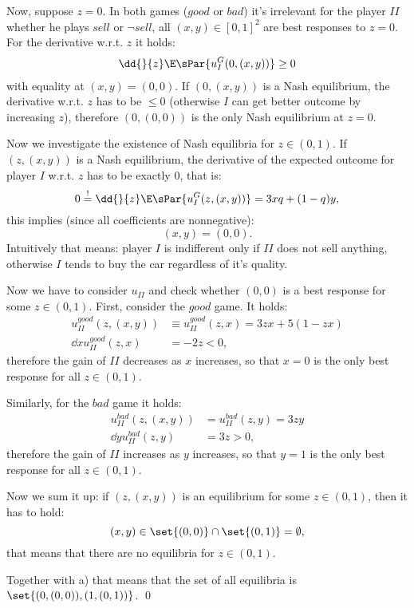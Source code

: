 \documentclass{scrartcl}
\newcommand{\subexercise}[1]{\vspace{0.8em}\noindent{\bf #1)}}
\begin{document}
Now, suppose $z=0$.
In both games ($good$ or $bad$) it's irrelevant for the player $II$
whether he plays $sell$ or $\neg sell$, all $(x,y) \in [0,1]^2$
are best responses to $z=0$. For the derivative w.r.t. $z$ it holds:
\begin{align*}
  \dd{}{z}\E\sPar{u_I^G(0, (x, y))} \geq 0
\end{align*}
with equality at $(x, y) = (0,0)$. If $(0, (x,y))$ is a Nash equilibrium,
the derivative w.r.t. $z$ has to be $\leq 0$ 
(otherwise $I$ can get better outcome by increasing $z$), 
therefore $(0, (0, 0))$ is the only Nash equilibrium
at $z=0$.

\subexercise{b}
Now we investigate the existence of Nash equilibria for $z\in(0, 1)$.
If $(z, (x, y))$ is a Nash equilibrium, the derivative of the
expected outcome for player $I$ w.r.t. $z$ has to be exactly $0$, that
is:
\[
  0 \overset{!}= \dd{}{z}\E\sPar{u_I^G(z, (x, y))} = 3xq + (1-q)y,
\]
this implies (since all coefficients are nonnegative):
\[
  (x, y) = (0, 0).
\]
Intuitively that means: player $I$ is indifferent only if $II$ does not
sell anything, otherwise $I$ tends to buy the car regardless of it's 
quality.

Now we have to consider $u_{II}$ and check whether $(0, 0)$ is a best
response for some $z\in(0, 1)$. First, consider the $good$ game.
It holds:
\begin{align*}
  u_{II}^{good}(z, (x, y)) &\equiv u_{II}^{good}(z, x) = 3zx + 5 (1-zx) \\
  \dd{}{x} u_{II}^{good}(z, x) &= -2z < 0,
\end{align*}
therefore the gain of $II$ decreases as $x$ increases, so that $x=0$ is the
only best response for all $z\in (0, 1)$.

Similarly, for the $bad$ game it holds:
\begin{align*}
  u_{II}^{bad}(z, (x, y)) &= u_{II}^{bad}(z, y) = 3zy \\
  \dd{}{y} u_{II}^{bad}(z, y) &= 3z > 0,
\end{align*}
therefore the gain of $II$ increases as $y$ increases, so that $y=1$ is
the only best response for all $z\in (0, 1)$.

Now we sum it up: 
if $(z, (x, y))$ is an equilibrium for some $z\in(0,1)$,
then it has to hold: 
\[
  (x,y) \in \set{(0, 0)} \cap \set{(0, 1)} = \emptyset,
\]
that means that there are no equilibria for $z\in (0, 1)$.

Together with a) that means that the set of all equilibria is 
$\set{(0,(0,0)),(1,(0,1))}$. \hfill \qed
\end{document}
